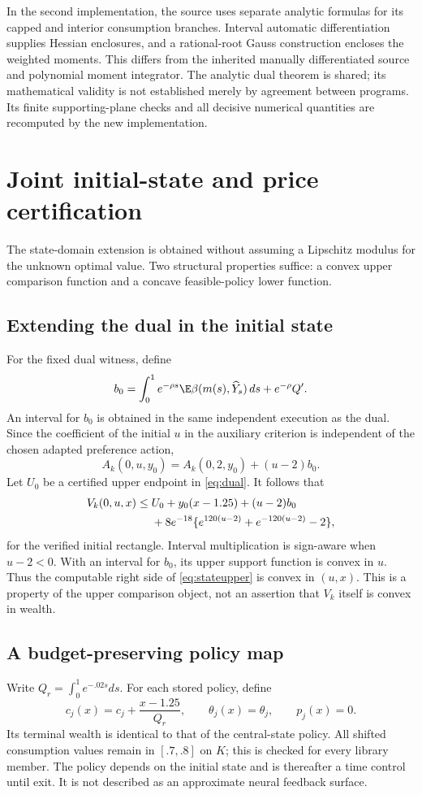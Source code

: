In the second implementation, the source uses separate analytic formulas for its capped and interior consumption branches. Interval automatic differentiation supplies Hessian enclosures, and a rational-root Gauss construction encloses the weighted moments. This differs from the inherited manually differentiated source and polynomial moment integrator. The analytic dual theorem is shared; its mathematical validity is not established merely by agreement between programs. Its finite supporting-plane checks and all decisive numerical quantities are recomputed by the new implementation.

\section{Joint initial-state and price certification}\label{sec:state}
The state-domain extension is obtained without assuming a Lipschitz modulus for the unknown optimal value. Two structural properties suffice: a convex upper comparison function and a concave feasible-policy lower function.

\subsection{Extending the dual in the initial state}
For the fixed dual witness, define
\begin{equation}
 b_0=\int_0^1e^{-\rho s}\E\beta(m(s),\widehat Y_s)\,ds+e^{-\rho}Q'.
 \label{eq:b0}
\end{equation}
An interval for $b_0$ is obtained in the same independent execution as the dual. Since the coefficient of the initial $u$ in the auxiliary criterion is independent of the chosen adapted preference action,
\[
 A_k(0,u,y_0)=A_k(0,2,y_0)+(u-2)b_0.
\]
Let $U_0$ be a certified upper endpoint in \eqref{eq:dual}. It follows that
\begin{align}
 V_k(0,u,x)\leq{}& U_0+y_0(x-1.25)+(u-2)b_0\notag\\
 &+8e^{-18}\{e^{120(u-2)}+e^{-120(u-2)}-2\},\label{eq:stateupper}
\end{align}
for the verified initial rectangle. Interval multiplication is sign-aware when $u-2<0$. With an interval for $b_0$, its upper support function is convex in $u$. Thus the computable right side of \eqref{eq:stateupper} is convex in $(u,x)$. This is a property of the upper comparison object, not an assertion that $V_k$ itself is convex in wealth.

\subsection{A budget-preserving policy map}
Write $Q_r=\int_0^1e^{-.02s}ds$. For each stored policy, define
\begin{equation}
 c_j(x)=c_j+\frac{x-1.25}{Q_r},\qquad
 \theta_j(x)=\theta_j,\qquad p_j(x)=0.\label{eq:budgetshift}
\end{equation}
Its terminal wealth is identical to that of the central-state policy. All shifted consumption values remain in $[.7,.8]$ on $K$; this is checked for every library member. The policy depends on the initial state and is thereafter a time control until exit. It is not described as an approximate neural feedback surface.

